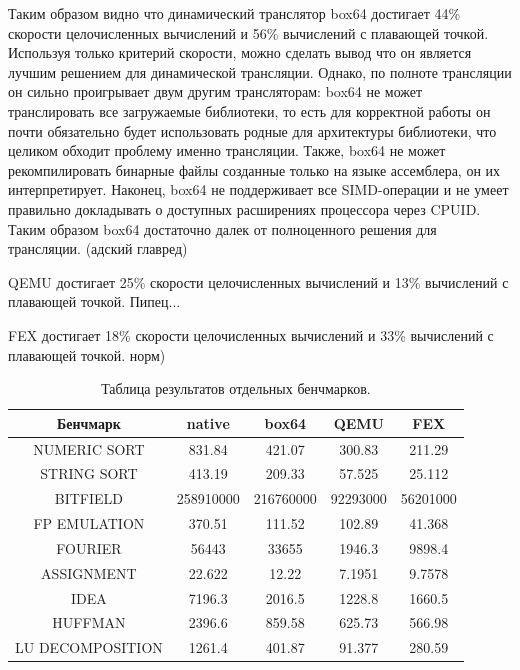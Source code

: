 Таким образом видно что динамический транслятор box64 достигает 44\% скорости целочисленных вычислений и 56\% вычислений с плавающей точкой. Используя только критерий скорости, можно сделать вывод что он является лучшим решением для динамической трансляции. Однако, по полноте трансляции он сильно проигрывает двум другим трансляторам: box64 не может транслировать все загружаемые библиотеки, то есть для корректной работы он почти обязательно будет использовать родные для архитектуры библиотеки, что целиком обходит проблему именно трансляции. Также, box64 не может рекомпилировать бинарные файлы созданные только на языке ассемблера, он их интерпретирует. Наконец, box64 не поддерживает все SIMD-операции и не умеет правильно докладывать о доступных расширениях процессора через CPUID. Таким образом box64 достаточно далек от полноценного решения для трансляции. (адский главред)

QEMU достигает 25\% скорости целочисленных вычислений и 13\% вычислений с плавающей точкой. Пипец...

FEX достигает 18\% скорости целочисленных вычислений и 33\% вычислений с плавающей точкой. норм)

\begin{table}[!htb]
	\label{table:methods}
	\begin{center}
		\caption{Таблица результатов отдельных бенчмарков.}
		\begin{tabular}{|c|c|c|c|c|}
			\hline
			\bfseries Бенчмарк & \bfseries native & \bfseries box64 & \bfseries QEMU & \bfseries FEX  \\
			\hline
			NUMERIC SORT & 831.84 & 421.07 & 300.83 & 211.29 \\ \hline
			STRING SORT & 413.19 & 209.33 & 57.525 & 25.112 \\ \hline
			BITFIELD & 258910000 & 216760000 & 92293000 & 56201000 \\ \hline
			FP EMULATION & 370.51 & 111.52 & 102.89 & 41.368 \\ \hline
			FOURIER & 56443 & 33655 & 1946.3 & 9898.4 \\ \hline
			ASSIGNMENT & 22.622 & 12.22 & 7.1951 & 9.7578 \\ \hline
			IDEA & 7196.3 & 2016.5 & 1228.8 & 1660.5 \\ \hline
			HUFFMAN & 2396.6 & 859.58 & 625.73 & 566.98 \\ \hline
			LU DECOMPOSITION & 1261.4 & 401.87 & 91.377 & 280.59 \\ \hline
		\end{tabular}
	\end{center}
\end{table}

